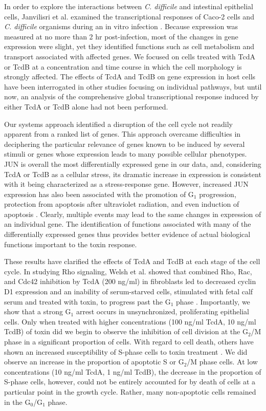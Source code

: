 In order to explore the interactions between \textit{C. difficile} and intestinal epithelial cells, Janvilisri et al. examined the transcriptional responses of Caco-2 cells and \textit{C. difficile} organisms during an in vitro infection \cite{Janvilisri:2010wf}. Because expression was measured at no more than 2 hr post-infection, most of the changes in gene expression were slight, yet they identified functions such as cell metabolism and transport associated with affected genes. We focused on cells treated with TcdA or TcdB at a concentration and time course in which the cell morphology is strongly affected. The effects of TcdA and TcdB on gene expression in host cells have been interrogated in other studies focusing on individual pathways, but until now, an analysis of the comprehensive global transcriptional response induced by either TcdA or TcdB alone had not been performed.

Our systems approach identified a disruption of the cell cycle not readily apparent from a ranked list of genes. This approach overcame difficulties in deciphering the particular relevance of genes known to be induced by several stimuli or genes whose expression leads to many possible cellular phenotypes. JUN is overall the most differentially expressed gene in our data, and, considering TcdA or TcdB as a cellular stress, its dramatic increase in expression is consistent with it being characterized as a stress-response gene. However, increased JUN expression has also been associated with the promotion of G$_{\text{1}}$ progression, protection from apoptosis after ultraviolet radiation, and even induction of apoptosis \cite{Ameyar:2003cc}. Clearly, multiple events may lead to the same changes in expression of an individual gene. The identification of functions associated with many of the differentially expressed genes thus provides better evidence of actual biological functions important to the toxin response. 

These results have clarified the effects of TcdA and TcdB at each stage of the cell cycle. In studying Rho signaling, Welsh et al. showed that combined Rho, Rac, and Cdc42 inhibition by TcdA (200 ng/ml) in fibroblasts led to decreased cyclin D1 expression and an inability of serum-starved cells, stimulated with fetal calf serum and treated with toxin, to progress past the G$_{\text{1}}$ phase \cite{Welsh:2001id}. Importantly, we show that a strong G$_{\text{1}}$ arrest occurs in unsynchronized, proliferating epithelial cells. Only when treated with higher concentrations (100 ng/ml TcdA, 10 ng/ml TcdB) of toxin did we begin to observe the inhibition of cell division at the G$_{\text{2}}$/M phase in a significant proportion of cells. With regard to cell death, others have shown an increased susceptibility of S-phase cells to toxin treatment \cite{Huelsenbeck:2007df}. We did observe an increase in the proportion of apoptotic S or G$_{\text{2}}$/M phase cells. At low concentrations (10 ng/ml TcdA, 1 ng/ml TcdB), the decrease in the proportion of S-phase cells, however, could not be entirely accounted for by death of cells at a particular point in the growth cycle. Rather, many non-apoptotic cells remained in the G$_{\text{0}}$/G$_{\text{1}}$ phase.

